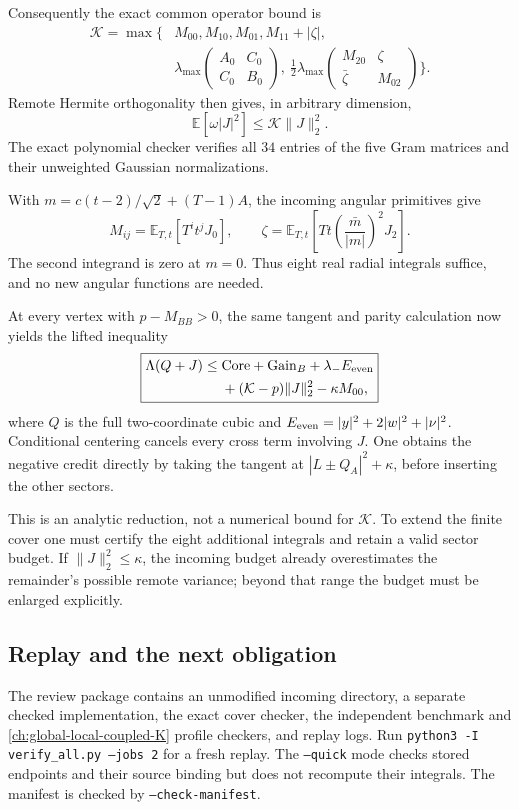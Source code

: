 Consequently the exact common operator bound is
\begin{align*}
\mathcal K=\max\bigg\{&
M_{00},M_{10},M_{01},M_{11}+|\zeta|,\\
&\lambda_{\max}
\begin{pmatrix}A_0&C_0\\C_0&B_0\end{pmatrix},
\ \frac12\lambda_{\max}
\begin{pmatrix}M_{20}&\zeta\\\bar\zeta&M_{02}\end{pmatrix}
\bigg\}.
\end{align*}
Remote Hermite orthogonality then gives, in arbitrary dimension,
\[
\mathbb E[\omega |J|^2]\le\mathcal K\|J\|_2^2.
\]
The exact polynomial checker verifies all \(34\) entries of the five
Gram matrices and their unweighted Gaussian normalizations.

With \(m=c(t-2)/\sqrt2+(T-1)A\), the incoming angular primitives give
\[
M_{ij}=\mathbb E_{T,t}[T^it^jJ_0],\qquad
\zeta=\mathbb E_{T,t}\left[
Tt\left(\frac{\bar m}{|m|}\right)^2J_2\right].
\]
The second integrand is zero at \(m=0\).
Thus eight real radial integrals suffice, and no new angular
functions are needed.

At every vertex with \(p-M_{BB}>0\), the same tangent and parity
calculation now yields the lifted inequality
\begin{align}
\boxed{\begin{aligned}
\Lambda(Q+J)\le{}&
\mathrm{Core}+\mathrm{Gain}_B+\lambda_-E_{\rm even}\\
&+(\mathcal K-p)\|J\|_2^2-\kappa M_{00},
\end{aligned}}
\label{eq:slab-eight-moment-lift}
\end{align}
where \(Q\) is the full two-coordinate cubic and
\(E_{\rm even}=|y|^2+2|w|^2+|\nu|^2\).
Conditional centering cancels every cross term involving \(J\).
One obtains the negative credit directly by taking the tangent at
\(|L\pm Q_A|^2+\kappa\), before inserting the other sectors.

This is an analytic reduction, not a numerical bound for
\(\mathcal K\). To extend the finite cover one must certify the
eight additional integrals and retain a valid sector budget.
If \(\|J\|_2^2\le\kappa\), the incoming budget already overestimates
the remainder's possible remote variance; beyond that range the
budget must be enlarged explicitly.

\subsection{Replay and the next obligation}
The review package contains an unmodified incoming directory, a
separate checked implementation, the exact cover checker, the
independent benchmark and \autoref{ch:global-local-coupled-K} profile checkers, and replay logs.
Run \texttt{python3 -I verify\_all.py --jobs 2} for a fresh replay.
The \texttt{--quick} mode checks stored endpoints and their source
binding but does not recompute their integrals.
The manifest is checked by \texttt{--check-manifest}.

